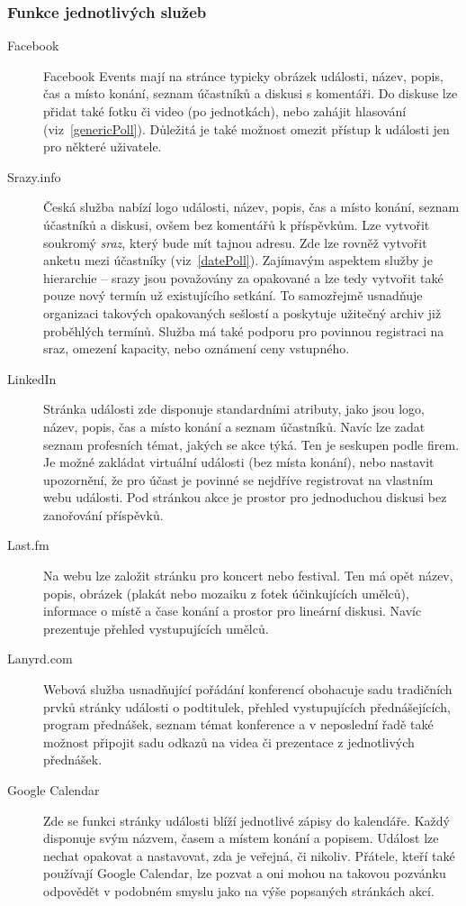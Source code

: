 \documentclass[12pt,oneside,final]{fithesis2}
\begin{document}
\subsubsection*{Funkce jednotlivých služeb}
\begin{description}
    \item[Facebook]
        Facebook Events mají na stránce typicky obrázek události, název, popis, čas a místo konání, seznam účastníků a diskusi s komentáři. Do diskuse lze přidat také fotku či video (po jednotkách), nebo zahájit hlasování (viz~\ref{genericPoll}). Důležitá je také možnost omezit přístup k události jen pro některé uživatele.

    \item[Srazy.info]
        Česká služba nabízí logo události, název, popis, čas a místo konání, seznam účastníků a diskusi, ovšem bez komentářů k příspěvkům. Lze vytvořit soukromý \emph{sraz}, který bude mít tajnou adresu. Zde lze rovněž vytvořit anketu mezi účastníky (viz~\ref{datePoll}). Zajímavým aspektem služby je hierarchie -- srazy jsou považovány za opakované a lze tedy vytvořit také pouze nový termín už existujícího setkání. To samozřejmě usnadňuje organizaci takových opakovaných sešlostí a poskytuje užitečný archiv již proběhlých termínů. Služba má také podporu pro povinnou registraci na sraz, omezení kapacity, nebo oznámení ceny vstupného.

    \item[LinkedIn]
        Stránka události zde disponuje standardními atributy, jako jsou logo, název, popis, čas a místo konání a seznam účastníků. Navíc lze zadat seznam profesních témat, jakých se akce týká. Ten je seskupen podle firem. Je možné zakládat virtuální události (bez místa konání), nebo nastavit upozornění, že pro účast je povinné se nejdříve registrovat na vlastním webu události. Pod stránkou akce je prostor pro jednoduchou diskusi bez zanořování příspěvků.

    \item[Last.fm]
        Na webu lze založit stránku pro koncert nebo festival. Ten má opět název, popis, obrázek (plakát nebo mozaiku z fotek účinkujících umělců), informace o místě a čase konání a prostor pro lineární diskusi. Navíc prezentuje přehled vystupujících umělců.

    \item[Lanyrd.com]
        Webová služba usnadňující pořádání konferencí obohacuje sadu tradičních prvků stránky události o podtitulek, přehled vystupujících přednášejících, program přednášek, seznam témat konference a v neposlední řadě také možnost připojit sadu odkazů na videa či prezentace z jednotlivých přednášek.

    \item[Google Calendar]
        Zde se funkci stránky události blíží jednotlivé zápisy do kalendáře. Každý disponuje svým názvem, časem a místem konání a popisem. Událost lze nechat opakovat a nastavovat, zda je veřejná, či nikoliv. Přátele, kteří také používají Google Calendar, lze pozvat a oni mohou na takovou pozvánku odpovědět v podobném smyslu jako na výše popsaných stránkách akcí.
\end{description}
\end{document}
